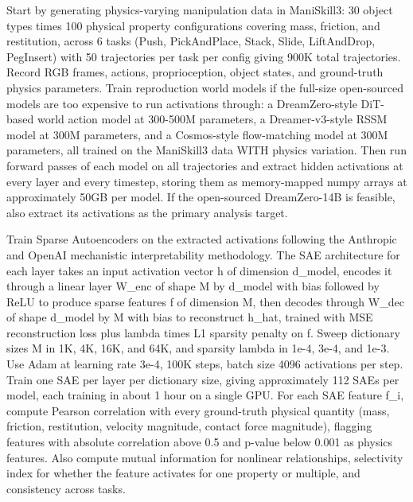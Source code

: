 \documentclass[11pt,a4paper]{article}
\begin{document}
Start by generating physics-varying manipulation data in ManiSkill3: 30 object types times 100 physical property configurations covering mass, friction, and restitution, across 6 tasks (Push, PickAndPlace, Stack, Slide, LiftAndDrop, PegInsert) with 50 trajectories per task per config giving 900K total trajectories. Record RGB frames, actions, proprioception, object states, and ground-truth physics parameters. Train reproduction world models if the full-size open-sourced models are too expensive to run activations through: a DreamZero-style DiT-based world action model at 300-500M parameters, a Dreamer-v3-style RSSM model at 300M parameters, and a Cosmos-style flow-matching model at 300M parameters, all trained on the ManiSkill3 data WITH physics variation. Then run forward passes of each model on all trajectories and extract hidden activations at every layer and every timestep, storing them as memory-mapped numpy arrays at approximately 50GB per model. If the open-sourced DreamZero-14B is feasible, also extract its activations as the primary analysis target.

Train Sparse Autoencoders on the extracted activations following the Anthropic and OpenAI mechanistic interpretability methodology. The SAE architecture for each layer takes an input activation vector h of dimension d\_model, encodes it through a linear layer W\_enc of shape M by d\_model with bias followed by ReLU to produce sparse features f of dimension M, then decodes through W\_dec of shape d\_model by M with bias to reconstruct h\_hat, trained with MSE reconstruction loss plus lambda times L1 sparsity penalty on f. Sweep dictionary sizes M in 1K, 4K, 16K, and 64K, and sparsity lambda in 1e-4, 3e-4, and 1e-3. Use Adam at learning rate 3e-4, 100K steps, batch size 4096 activations per step. Train one SAE per layer per dictionary size, giving approximately 112 SAEs per model, each training in about 1 hour on a single GPU. For each SAE feature f\_i, compute Pearson correlation with every ground-truth physical quantity (mass, friction, restitution, velocity magnitude, contact force magnitude), flagging features with absolute correlation above 0.5 and p-value below 0.001 as physics features. Also compute mutual information for nonlinear relationships, selectivity index for whether the feature activates for one property or multiple, and consistency across tasks.
\end{document}
